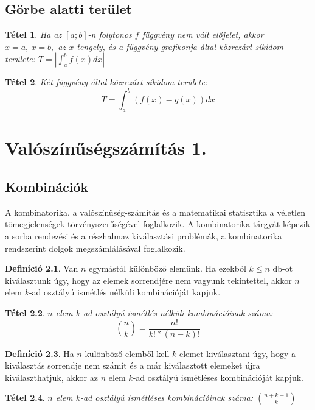 \documentclass[twoside,12pt]{report}
\newtheorem{theorem}{Tétel}[section]
\theoremstyle{definition}
\newtheorem{definition}[theorem]{Definíció}
\begin{document}
\section{Görbe alatti terület}
	\begin{theorem}
		Ha az $[a;b]$-n folytonos $f$ függvény nem vált előjelet, akkor $x=a,\ x=b,$ az $x$ tengely, és a függvény grafikonja által közrezárt síkidom területe: $T=\left|\int_{a}^{b}f(x)dx\right|$
	\end{theorem}
	\begin{theorem}
		Két függvény által közrezárt síkidom területe:
		\begin{equation*}
			T=\int_{a}^{b}(f(x)-g(x))dx\tag{ha $f(x)>g(x)$}
		\end{equation*}
	\end{theorem}
\chapter{Valószínűségszámítás 1.}
\section{Kombinációk}
	A kombinatorika, a valószínűség-számítás és a matematikai statisztika a véletlen tömegjelenségek
	törvényszerűségével foglalkozik. A kombinatorika tárgyát képezik a sorba rendezési és a részhalmaz
	kiválasztási problémák, a kombinatorika rendszerint dolgok megszámlálásával foglalkozik.
	\begin{definition}
		Van $n$ egymástól különböző elemünk. Ha ezekből $k\le n$ db-ot kiválasztunk úgy, hogy az elemek sorrendjére nem vagyunk tekintettel, akkor $n$ elem $k$-ad osztályú ismétlés nélküli kombinációját kapjuk.
	\end{definition}
	\begin{theorem}
		$n$ elem $k$-ad osztályú ismétlés nélküli kombinációinak száma:
		\begin{equation*}
			\binom{n}{k}=\frac{n!}{k!*(n-k)!}
		\end{equation*}
	\end{theorem}
	\begin{definition}
		Ha $n$ különböző elemből kell $k$ elemet kiválasztani úgy, hogy a kiválasztás sorrendje nem számít és a már kiválasztott elemeket újra kiválaszthatjuk, akkor az $n$ elem $k$-ad osztályú ismétléses kombinációját kapjuk.
	\end{definition}
	\begin{theorem}
		$n$ elem $k$-ad osztályú ismétléses kombinációinak száma: $\binom{n+k-1}{k}$
	\end{theorem}
\end{document}
